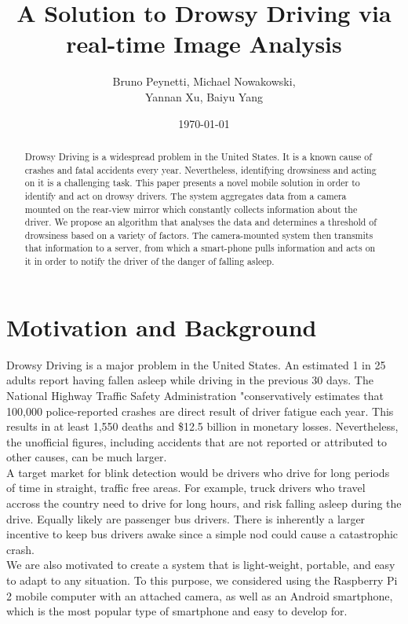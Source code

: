 \documentclass[twocolumn]{article}
\title{A Solution to Drowsy Driving via real-time Image Analysis}
\author{Bruno Peynetti, Michael Nowakowski, \\Yannan Xu, Baiyu Yang}
\date{\today}
\begin{document}
\maketitle



\begin{abstract}
Drowsy Driving is a widespread problem in the United States. It is a known cause of crashes and fatal accidents every year. Nevertheless, identifying drowsiness and acting on it is a challenging task. This paper presents a novel mobile solution in order to identify and act on drowsy drivers. The system aggregates data from a camera mounted on the rear-view mirror which constantly collects information about the driver. We propose an algorithm that analyses the data and determines a threshold of drowsiness based on a variety of factors. The camera-mounted system then transmits that information to a server, from which a smart-phone pulls information and acts on it in order to notify the driver of the danger of falling asleep. 
\end{abstract}

\section{Motivation and Background}
Drowsy Driving is a major problem in the United States. An estimated 1 in 25 adults report having fallen asleep while driving in the previous 30 days. The National Highway Traffic Safety Administration "conservatively estimates that 100,000 police-reported crashes are direct result of driver fatigue each year. This results in at least 1,550 deaths and \$12.5 billion in monetary losses. Nevertheless, the unofficial figures, including accidents that are not reported or attributed to other causes, can be much larger.  \\
A target market for blink detection would be drivers who drive for long periods of time in straight, traffic free areas. For example, truck drivers who travel accross the country need to drive for long hours, and risk falling asleep during the drive. Equally likely are passenger bus drivers. There is inherently a larger incentive to keep bus drivers awake since a simple nod could cause a catastrophic crash. \\
We are also motivated to create a system that is light-weight, portable, and easy to adapt to any situation. To this purpose, we considered using the Raspberry Pi 2 mobile computer with an attached camera, as well as an Android smartphone, which is the most popular type of smartphone and easy to develop for. 
\end{document}
